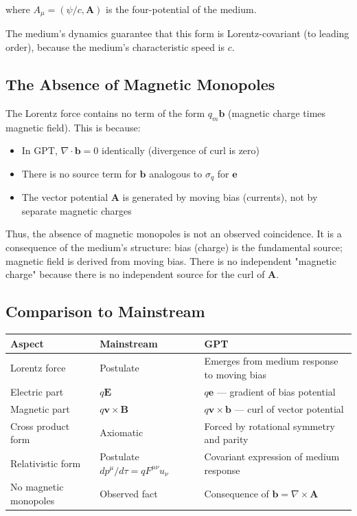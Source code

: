 \documentclass[12pt, a4paper]{article}
\begin{document}
where \( A_\mu = (\psi/c, \mathbf{A}) \) is the four-potential of the medium.

The medium's dynamics guarantee that this form is Lorentz-covariant (to leading order), because the medium's characteristic speed is \( c \).

\subsection{The Absence of Magnetic Monopoles}
\label{subsec:no_monopoles}

The Lorentz force contains no term of the form \( q_m \mathbf{b} \) (magnetic charge times magnetic field). This is because:

\begin{itemize}
    \item In GPT, \( \nabla \cdot \mathbf{b} = 0 \) identically (divergence of curl is zero)
    \item There is no source term for \( \mathbf{b} \) analogous to \( \sigma_q \) for \( \mathbf{e} \)
    \item The vector potential \( \mathbf{A} \) is generated by moving bias (currents), not by separate magnetic charges
\end{itemize}

Thus, the absence of magnetic monopoles is not an observed coincidence. It is a consequence of the medium's structure: bias (charge) is the fundamental source; magnetic field is derived from moving bias. There is no independent "magnetic charge" because there is no independent source for the curl of \( \mathbf{A} \).

\subsection{Comparison to Mainstream}
\label{subsec:lorentz_comparison}

\begin{center}
\begin{tabular}{|p{3.5cm}|p{5cm}|p{5cm}|}
\hline
\textbf{Aspect} & \textbf{Mainstream} & \textbf{GPT} \\
\hline
Lorentz force & Postulate & Emerges from medium response to moving bias \\
\hline
Electric part & \( q\mathbf{E} \) & \( q\mathbf{e} \) — gradient of bias potential \\
\hline
Magnetic part & \( q\mathbf{v} \times \mathbf{B} \) & \( q\mathbf{v} \times \mathbf{b} \) — curl of vector potential \\
\hline
Cross product form & Axiomatic & Forced by rotational symmetry and parity \\
\hline
Relativistic form & Postulate \( dp^\mu/d\tau = q F^{\mu\nu} u_\nu \) & Covariant expression of medium response \\
\hline
No magnetic monopoles & Observed fact & Consequence of \( \mathbf{b} = \nabla \times \mathbf{A} \) \\
\hline
\end{tabular}
\end{center}
\end{document}
